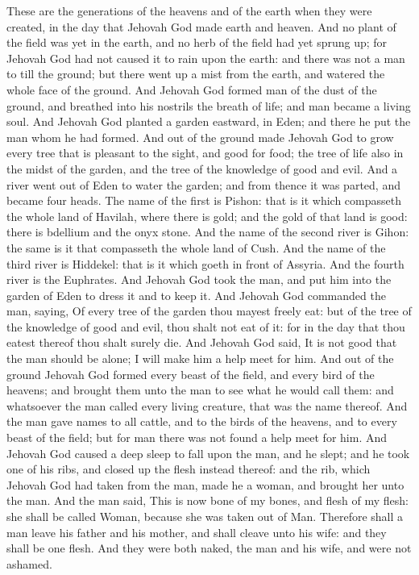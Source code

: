 These are the generations of the heavens and of the earth when they were created, in the day that Jehovah God made earth and heaven. And no plant of the field was yet in the earth, and no herb of the field had yet sprung up; for Jehovah God had not caused it to rain upon the earth: and there was not a man to till the ground; but there went up a mist from the earth, and watered the whole face of the ground. And Jehovah God formed man of the dust of the ground, and breathed into his nostrils the breath of life; and man became a living soul. And Jehovah God planted a garden eastward, in Eden; and there he put the man whom he had formed. And out of the ground made Jehovah God to grow every tree that is pleasant to the sight, and good for food; the tree of life also in the midst of the garden, and the tree of the knowledge of good and evil. And a river went out of Eden to water the garden; and from thence it was parted, and became four heads. The name of the first is Pishon: that is it which compasseth the whole land of Havilah, where there is gold; and the gold of that land is good: there is bdellium and the onyx stone. And the name of the second river is Gihon: the same is it that compasseth the whole land of Cush. And the name of the third river is Hiddekel: that is it which goeth in front of Assyria. And the fourth river is the Euphrates. And Jehovah God took the man, and put him into the garden of Eden to dress it and to keep it. And Jehovah God commanded the man, saying, Of every tree of the garden thou mayest freely eat: but of the tree of the knowledge of good and evil, thou shalt not eat of it: for in the day that thou eatest thereof thou shalt surely die.  And Jehovah God said, It is not good that the man should be alone; I will make him a help meet for him. And out of the ground Jehovah God formed every beast of the field, and every bird of the heavens; and brought them unto the man to see what he would call them: and whatsoever the man called every living creature, that was the name thereof. And the man gave names to all cattle, and to the birds of the heavens, and to every beast of the field; but for man there was not found a help meet for him. And Jehovah God caused a deep sleep to fall upon the man, and he slept; and he took one of his ribs, and closed up the flesh instead thereof: and the rib, which Jehovah God had taken from the man, made he a woman, and brought her unto the man. And the man said, This is now bone of my bones, and flesh of my flesh: she shall be called Woman, because she was taken out of Man. Therefore shall a man leave his father and his mother, and shall cleave unto his wife: and they shall be one flesh. And they were both naked, the man and his wife, and were not ashamed. 

